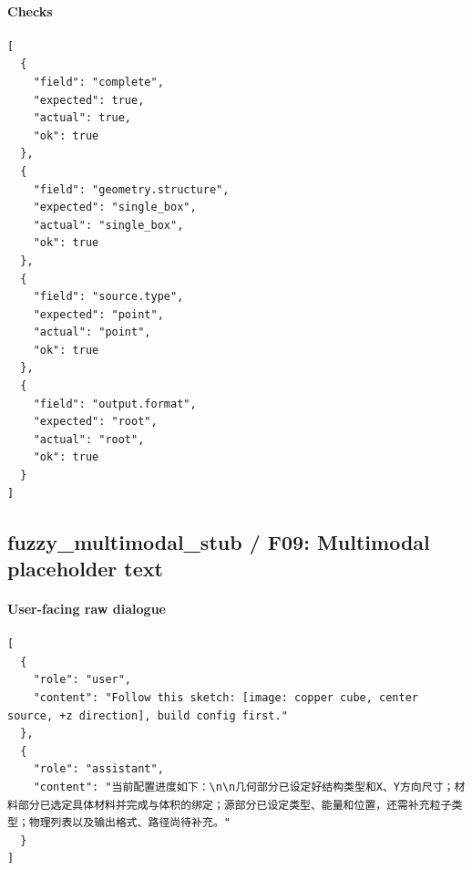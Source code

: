 \documentclass[11pt]{ctexart}
\begin{document}
\paragraph{Checks}
\begin{lstlisting}
[
  {
    "field": "complete",
    "expected": true,
    "actual": true,
    "ok": true
  },
  {
    "field": "geometry.structure",
    "expected": "single_box",
    "actual": "single_box",
    "ok": true
  },
  {
    "field": "source.type",
    "expected": "point",
    "actual": "point",
    "ok": true
  },
  {
    "field": "output.format",
    "expected": "root",
    "actual": "root",
    "ok": true
  }
]
\end{lstlisting}
\subsection{fuzzy\_multimodal\_stub / F09: Multimodal placeholder text}
\paragraph{User-facing raw dialogue}
\begin{lstlisting}
[
  {
    "role": "user",
    "content": "Follow this sketch: [image: copper cube, center source, +z direction], build config first."
  },
  {
    "role": "assistant",
    "content": "当前配置进度如下：\n\n几何部分已设定好结构类型和X、Y方向尺寸；材料部分已选定具体材料并完成与体积的绑定；源部分已设定类型、能量和位置，还需补充粒子类型；物理列表以及输出格式、路径尚待补充。"
  }
]
\end{lstlisting}
\end{document}
